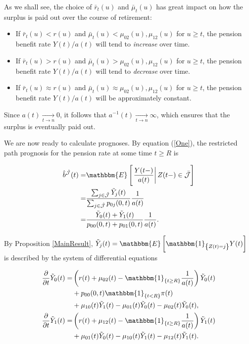 \documentclass{article}
\newcommand{\1}[1]{\mathbbm{1}_{\left\lbrace #1 \right\rbrace}}
\newcommand{\expec}[1][def]{\mathbbm{E} \left[ #1 \right]}
\newcommand{\econd}[2][def]{\mathbbm{E} \left[ \left. #1 \right| #2 \right]}
\theoremstyle{break}
\theoremstyle{remark}
\newenvironment{remark}
  {\pushQED{\qed}\renewcommand{\qedsymbol}{\scalebox{1.4}{$\circ$}}\remarkx}
  {\popQED\endremarkx}
\numberwithin{equation}{section}
\begin{document}
\begin{remark}
	As we shall see, the choice of $\bar{r}_t(u)$ and $\bar{\mu}_t(u)$ has great impact on how the surplus is paid out over the course of retirement:

\begin{itemize}
	\item If $\bar{r}_t(u)<r(u)$ and $\bar{\mu}_t(u)<\mu_{02}(u),\mu_{12}(u)$ for $u \geq t$, the pension benefit rate $Y(t)/a(t)$ will tend to \textit{increase} over time.
	\item If $\bar{r}_t(u)>r(u)$ and $\bar{\mu}_t(u)>\mu_{02}(u),\mu_{12}(u)$ for $u \geq t$, the pension benefit rate $Y(t)/a(t)$ will tend to \textit{decrease} over time.
	\item If $\bar{r}_t(u)\approx r(u)$ and $\bar{\mu}_t(u)\approx \mu_{02}(u),\mu_{12}(u)$ for $u \geq t$, the pension benefit rate $Y(t)/a(t)$ will be approximately constant.
\end{itemize}

Since $a(t) \underset{t \to n}{\longrightarrow} 0$, it follows that $a^{-1}(t) \underset{t \to n}{\longrightarrow} \infty$, which ensures that the surplus is eventually paid out.
\end{remark}

We are now ready to calculate prognoses. By equation (\ref{One}), the restricted path prognosis for the pension rate at some time $t \geq R$ is

\begin{align} \label{Naja}
\begin{split}
		\hat{b}^{\hat{\mathcal{J}}}(t) =& \econd[\frac{Y(t-)}{a(t)}]{Z(t-) \in \bar{\mathcal{J}}} \\
	=&\frac{\sum_{j \in \hat{\mathcal{J}}} \tilde{Y}_j(t)}{\sum_{j \in \hat{\mathcal{J}}} p_{0j}(0,t)} \frac{1}{a(t)} \\
	=&\frac{\tilde{Y}_0(t) + \tilde{Y}_1(t)}{p_{00}(0,t) + p_{01}(0,t)} \frac{1}{a(t)}.
\end{split}
\end{align}

By Proposition \ref{MainResult}, $\tilde{Y}_j(t) = \expec[\1{Z(t)=j} Y(t)]$ is described by the system of differential equations

\begin{align} \label{Jaja}
\begin{split}
	\frac{\partial}{\partial t} \tilde{Y}_0(t) =& \left( r(t) + \mu_{02}(t) - \1{t \geq R} \frac{1}{a(t)}\right) \tilde{Y}_0(t) \\
	&+ p_{00}(0,t) \1{t<R} \pi(t) \\
	&+ \mu_{10}(t) \tilde{Y}_1(t) - \mu_{01}(t) \tilde{Y}_0(t) - \mu_{02}(t) \tilde{Y}_0(t), \\
	\frac{\partial}{\partial t} \tilde{Y}_1(t) =& \left( r(t) + \mu_{12}(t) - \1{t \geq R} \frac{1}{a(t)}\right) \tilde{Y}_1(t) \\
	&+ \mu_{01}(t) \tilde{Y}_0(t) - \mu_{10}(t) \tilde{Y}_1(t) - \mu_{12}(t) \tilde{Y}_1(t).
\end{split}
\end{align}
\end{document}
